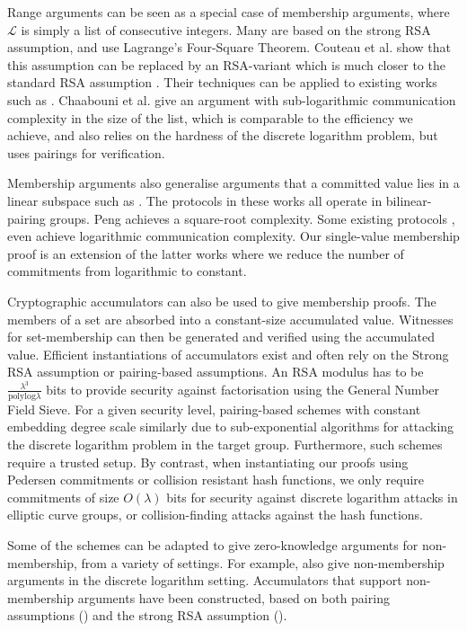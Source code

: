 Range arguments can be seen as a special case of membership arguments, where $\mathcal{L}$ is simply a list of consecutive integers. Many are based on the strong RSA assumption, and use Lagrange's Four-Square Theorem. Couteau et al. show that this assumption can be replaced by an RSA-variant which is much closer to the standard RSA assumption \cite{CouteauPP17}. Their techniques can be applied to existing works such as \cite{Groth05,Lip03}. Chaabouni et al.  \cite{Chaabouni2010} give an argument with sub-logarithmic communication complexity in the size of the list, which is comparable to the efficiency we achieve, and also relies on the hardness of the discrete logarithm problem, but uses pairings for verification.

Membership arguments also generalise arguments that a committed value lies in a linear subspace such as \cite{Jutla2013,Jutla2014,Kiltz2015}. The protocols in these works all operate in bilinear-pairing groups. Peng \cite{Peng2012} achieves a square-root complexity. Some existing protocols \cite{BayerG13}, \cite{GrothK15} even achieve logarithmic communication complexity. Our single-value membership proof is an extension of the latter works where we reduce the number of commitments from logarithmic to constant.

Cryptographic accumulators \cite{Benaloh1994,Ngu05,Camenisch2009,Camenisch2002} can also be used to give membership proofs. The members of a set are absorbed into a constant-size accumulated value. Witnesses for set-membership can then be generated and verified using the accumulated value. Efficient instantiations of accumulators exist and often rely on the Strong RSA assumption or pairing-based assumptions. An RSA modulus has to be $\frac{\lambda^3}{\mathrm{polylog}\lambda}$ bits to provide security against factorisation using the General Number Field Sieve. For a given security level, pairing-based schemes with constant embedding degree scale similarly due to sub-exponential algorithms for attacking the discrete logarithm problem in the target group. Furthermore, such schemes require a trusted setup. By contrast, when instantiating our proofs using Pedersen commitments or collision resistant hash functions, we only require commitments of size $O(\lambda)$ bits for security against discrete logarithm attacks in elliptic curve groups, or collision-finding attacks against the hash functions.

Some of the schemes can be adapted to give zero-knowledge arguments for non-membership, from a variety of settings. For example, \cite{BayerG13,Peng2012} also give non-membership arguments in the discrete logarithm setting. Accumulators that support non-membership arguments have been constructed, based on both pairing assumptions (\cite{Damgard2008}) and the strong RSA assumption (\cite{Li2007}).

